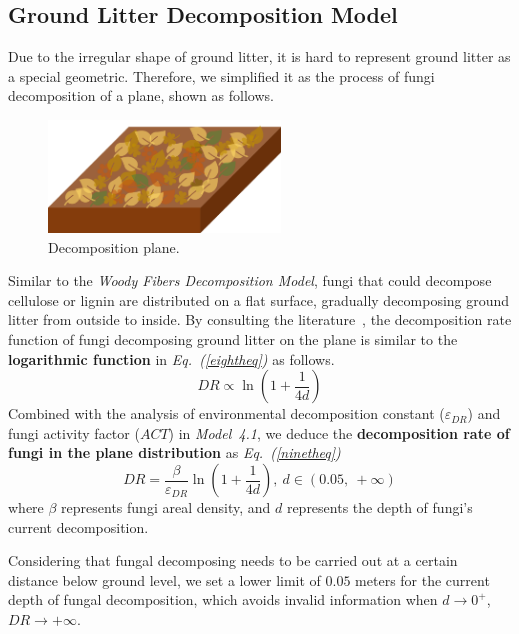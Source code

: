 \subsection{Ground Litter Decomposition Model}
Due to the irregular shape of ground litter, it is hard to represent ground litter as a special geometric. Therefore, we simplified it as the process of fungi decomposition of a plane, shown as follows.
\par
\begin{figure}[H]
  \label{figure2}
  \centering
  \includegraphics[width=0.55\textwidth]{figures/litter.png}
  \caption{Decomposition plane.}
\end{figure}
\par
Similar to the \textit{Woody Fibers Decomposition Model}, fungi that could decompose cellulose or lignin are distributed on a flat surface, gradually decomposing ground litter from outside to inside. By consulting the literature~\cite{literature}, the decomposition rate function of fungi decomposing ground litter on the plane is similar to the \textbf{logarithmic function} in \textit{Eq.~(\ref{eightheq})} as follows.
\begin{equation}
  \label{eightheq}
  DR \propto \ln (1+\frac{1}{4d})
\end{equation}
Combined with the analysis of environmental decomposition constant ($\varepsilon_{DR}$) and fungi activity factor ($ACT$) in \textit{Model~4.1}, we deduce the \textbf{decomposition rate of fungi in the plane distribution} as \textit{Eq.~(\ref{ninetheq})}
\begin{equation}
  \label{ninetheq}
  DR=\frac{\beta}{\varepsilon_{DR}} \ln (1+\frac{1}{4d}),\ d\in (0.05,\ +\infty)
\end{equation}
where $\beta$ represents fungi areal density, and $d$ represents the depth of fungi's current decomposition.
\par
Considering that fungal decomposing needs to be carried out at a certain distance below ground level, we set a lower limit of $0.05$ meters for the current depth of fungal decomposition, which avoids invalid information when $d\longrightarrow 0^+$, $DR\longrightarrow +\infty$.